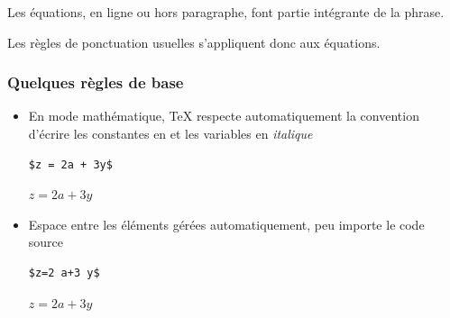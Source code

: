 \begin{frame}[plain]
  \begin{conseil}
    Les équations, en ligne ou hors paragraphe, font partie intégrante
    de la phrase.

    \bigskip %
    Les règles de ponctuation usuelles s'appliquent donc aux
    équations.
  \end{conseil}

  \vspace{18pt}
\end{frame}

\begin{frame}[fragile]
  \frametitle{Quelques règles de base}
  \begin{itemize}
  \item En mode mathématique, {\TeX} respecte automatiquement la
    convention d'écrire les constantes en  et les
    variables en \textit{italique}
    \begin{demo}
      \begin{texample}
\begin{lstlisting}
$z = 2a + 3y$
\end{lstlisting}
        \producing
        $z = 2a + 3y$
      \end{texample}
    \end{demo}
  \item Espace entre les éléments gérées automatiquement, peu importe
    le code source
    \begin{demo}
      \begin{texample}
\begin{lstlisting}
$z=2 a+3 y$
\end{lstlisting}
        \producing
        $z=2 a+3 y$
      \end{texample}
    \end{demo}
  \end{itemize}
\end{frame}

